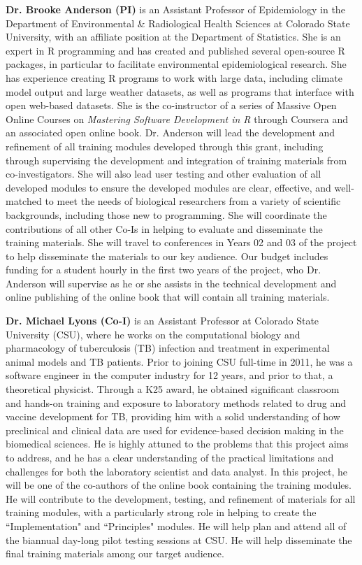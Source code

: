 \documentclass[pdftex,english,11pt,parskip=half]{scrartcl}
\begin{document}
\noindent \textbf{Dr. Brooke Anderson (PI)} is an Assistant Professor of
Epidemiology in the Department of Environmental \& Radiological Health Sciences
at Colorado State University, with an affiliate position at the Department of
Statistics. She is an expert in R programming and has created and published
several open-source R packages, in particular to facilitate environmental
epidemiological research. She has experience creating R programs to work with
large data, including climate model output and large weather datasets, as well
as programs that interface with open web-based datasets. She is the
co-instructor of a series of Massive Open Online Courses on \textit{Mastering
Software Development in R} through Coursera and an associated open online book.
Dr. Anderson will lead the development and refinement of all training modules
developed through this grant, including through supervising the development and
integration of training materials from co-investigators. She will also lead user
testing and other evaluation of all developed modules to ensure the developed
modules are clear, effective, and well-matched to meet the needs of biological
researchers from a variety of scientific backgrounds, including those new to
programming. She will coordinate the contributions of all other Co-Is in helping
to evaluate and disseminate the training materials. She will travel to
conferences in Years 02 and 03 of the project to help disseminate the materials
to our key audience. Our budget includes funding for a student hourly in the
first two years of the project, who Dr. Anderson will supervise as he or she
assists in the technical development and online publishing of the online book
that will contain all training materials.

\noindent \textbf{Dr. Michael Lyons (Co-I)} is an Assistant Professor at
Colorado State University (CSU), where he works on the computational biology and
pharmacology of tuberculosis (TB) infection and treatment in experimental animal
models and TB patients. Prior to joining CSU full-time in 2011, he was a
software engineer in the computer industry for 12 years, and prior to that, a
theoretical physicist. Through a K25 award, he obtained significant classroom
and hands-on training and exposure to laboratory methods related to drug and
vaccine development for TB, providing him with a solid understanding of how
preclinical and clinical data are used for evidence-based decision making in the
biomedical sciences. He is highly attuned to the problems that this project aims
to address, and he has a clear understanding of the practical limitations and
challenges for both the laboratory scientist and data analyst. In this project,
he will be one of the co-authors of the online book containing the training
modules. He will contribute to the development, testing, and refinement of
materials for all training modules, with a particularly strong role in helping
to create the ``Implementation" and ``Principles" modules. He will help plan and
attend all of the biannual day-long pilot testing sessions at CSU. He will help
disseminate the final training materials among our target audience. 
\end{document}
